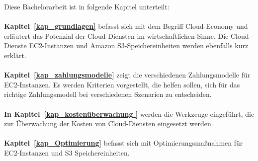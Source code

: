 
Diese Bachelorarbeit ist in folgende Kapitel unterteilt:\\\\
\textbf{Kapitel~\ref{kap_grundlagen}} 
befasst sich mit dem Begriff Cloud-Economy und erläutert das Potenzial der Cloud-Diensten im wirtschaftlichen Sinne. Die Cloud-Dienste EC2-Instanzen und Amazon S3-Speichereinheiten werden ebenfalls kurz erklärt. %
\\\\
\textbf{Kapitel~\ref{kap_zahlungsmodelle}} 
zeigt die verschiedenen Zahlungsmodelle für EC2-Instanzen. Es werden Kriterien vorgestellt, die helfen sollen, sich für das richtige Zahlungsmodell bei verschiedenen Szenarien zu entscheiden. 
\\\\
\textbf{In Kapitel~\ref{kap_kostenüberwachung }} werden die Werkzeuge eingeführt, die zur Überwachung der Kosten von Cloud-Diensten eingesetzt werden.
\\\\
\textbf{Kapitel~\ref{kap_Optimierung}} befasst sich mit Optimierungsmaßnahmen %
für EC2-Instanzen und S3 Speichereinheiten.

 
